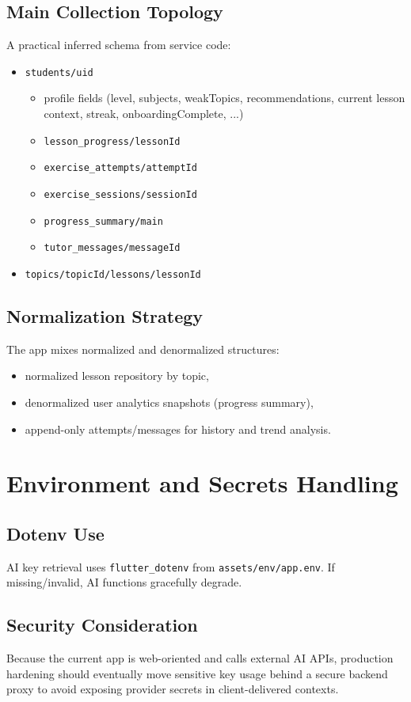 \documentclass[11pt,a4paper]{article}
\begin{document}
\subsection{Main Collection Topology}
A practical inferred schema from service code:
\begin{itemize}
  \item \texttt{students/{uid}}
  \begin{itemize}
    \item profile fields (level, subjects, weakTopics, recommendations, current lesson context, streak, onboardingComplete, ...)
    \item \texttt{lesson\_progress/{lessonId}}
    \item \texttt{exercise\_attempts/{attemptId}}
    \item \texttt{exercise\_sessions/{sessionId}}
    \item \texttt{progress\_summary/main}
    \item \texttt{tutor\_messages/{messageId}}
  \end{itemize}
  \item \texttt{topics/{topicId}/lessons/{lessonId}}
\end{itemize}

\subsection{Normalization Strategy}
The app mixes normalized and denormalized structures:
\begin{itemize}
  \item normalized lesson repository by topic,
  \item denormalized user analytics snapshots (progress summary),
  \item append-only attempts/messages for history and trend analysis.
\end{itemize}

\section{Environment and Secrets Handling}
\subsection{Dotenv Use}
AI key retrieval uses \texttt{flutter\_dotenv} from \texttt{assets/env/app.env}. If missing/invalid, AI functions gracefully degrade.

\subsection{Security Consideration}
Because the current app is web-oriented and calls external AI APIs, production hardening should eventually move sensitive key usage behind a secure backend proxy to avoid exposing provider secrets in client-delivered contexts.
\end{document}
